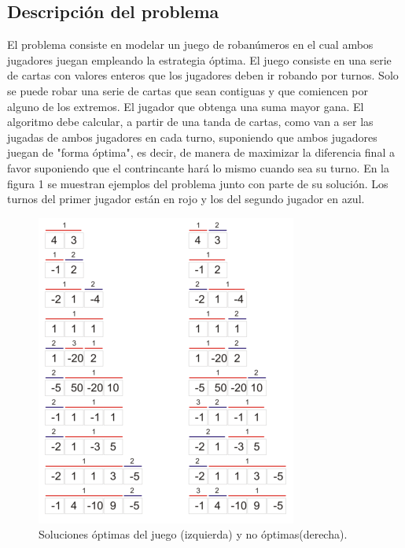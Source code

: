 %
%
%
%
%

\subsection{Descripci\'on del problema}
El problema consiste en modelar un juego de roban\'umeros en el cual ambos jugadores juegan empleando la estrategia \'optima. El juego consiste en una serie de cartas con valores enteros que los jugadores deben ir robando por turnos. Solo se puede robar una serie de cartas que sean contiguas y que comiencen por alguno de los extremos. El jugador que obtenga una suma mayor gana.
El algoritmo debe calcular, a partir de una tanda de cartas, como van a ser las jugadas de ambos jugadores en cada turno, suponiendo que ambos jugadores juegan de "forma \'optima", es decir, de manera de maximizar la diferencia final a favor suponiendo que el contrincante har\'a lo mismo cuando sea su turno.
En la figura 1 se muestran ejemplos del problema junto con parte de su soluci\'on. Los turnos del primer jugador est\'an en rojo y los del segundo jugador en azul.

\begin{figure}[h]
\centering
\includegraphics{cartas.png}
\caption{Soluciones \'optimas del juego (izquierda) y no \'optimas(derecha).}
\end{figure}

